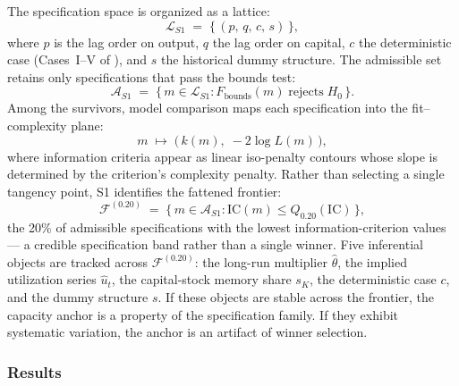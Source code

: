 \documentclass[11pt,a4paper]{article}
\begin{document}
The specification space is organized as a lattice:
%
\begin{equation}
	\label{eq:S1_lattice}
	\mathcal{L}_{S1} \;=\; \bigl\{\,(p,\, q,\, c,\, s)\,\bigr\},
\end{equation}
%
where $p$ is the lag order on output, $q$ the lag order on capital, $c$ the
deterministic case (Cases~I--V of \citealt{Pesaran2001}), and $s$ the
historical dummy structure. The admissible set retains only specifications
that pass the bounds test:
%
\begin{equation}
	\label{eq:S1_admissible}
	\mathcal{A}_{S1} \;=\;
	\bigl\{\, m \in \mathcal{L}_{S1} :
	F_{\text{bounds}}(m) \;\text{rejects}\; H_0 \,\bigr\}.
\end{equation}
%
Among the survivors, model comparison maps each specification into the
fit--complexity plane:
%
\begin{equation}
	\label{eq:S1_fitcomplexity}
	m \;\mapsto\; \bigl(\,k(m),\; -2\log L(m)\,\bigr),
\end{equation}
%
where information criteria appear as linear iso-penalty contours whose slope
is determined by the criterion's complexity penalty. Rather than selecting a
single tangency point, S1 identifies the fattened frontier:
%
\begin{equation}
	\label{eq:S1_frontier}
	\mathcal{F}^{(0.20)} \;=\;
	\bigl\{\, m \in \mathcal{A}_{S1} :
	\mathrm{IC}(m) \leq Q_{0.20}(\mathrm{IC}) \,\bigr\},
\end{equation}
%
the 20\% of admissible specifications with the lowest information-criterion
values --- a credible specification band rather than a single winner. Five
inferential objects are tracked across $\mathcal{F}^{(0.20)}$: the long-run
multiplier $\hat{\theta}$, the implied utilization series $\widehat{u}_t$,
the capital-stock memory share $s_K$, the deterministic case $c$, and the
dummy structure $s$. If these objects are stable across the frontier, the
capacity anchor is a property of the specification family. If they exhibit
systematic variation, the anchor is an artifact of winner selection.



\subsubsection{Results}
\label{subsec:S1_results}
\end{document}
